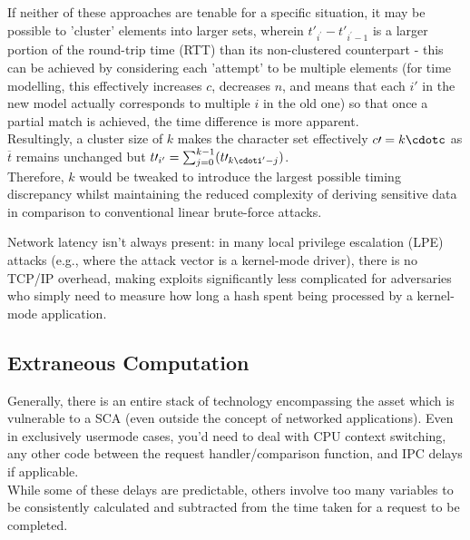 			
				If neither of these approaches are tenable for a specific situation, it may be possible to 'cluster' elements into larger sets, wherein
				\emph{${t\prime}_{i^\prime} - {t\prime}_{i^\prime-1}$} is a larger portion of the round-trip time (RTT) than its non-clustered counterpart -
				this can be achieved by considering each 'attempt' to be
				multiple elements (for time modelling, this effectively increases \emph{$c$}, decreases \emph{$n$}, and means that each \emph{$i\prime$}
				in the new model actually corresponds to multiple \emph{$i$} in the old one) so that once a partial match is achieved, the time difference
				is more apparent.\\
Resultingly, a cluster size of \emph{$k$} makes the character set effectively \emph{$c\prime=k\cdotc$} as
				\emph{$\overline{t}$} remains unchanged but \emph{$t\prime_{i^\prime} = \sum_{j=0}^{k-1}({t\prime}_{k\cdoti^\prime-j})$}.
				\\
Therefore, \emph{$k$} would be tweaked to introduce the largest possible timing discrepancy whilst maintaining the reduced complexity of
				deriving sensitive data in comparison to conventional linear brute-force attacks.
			

			
				Network latency isn't always present: in many local privilege escalation (LPE) attacks (e.g., where the attack vector is a kernel-mode driver),
				there is no TCP/IP overhead, making exploits significantly less complicated for adversaries who simply need to measure how long a hash spent being processed
				by a kernel-mode application.
			

\subsection{Extraneous Computation}
			
				Generally, there is an entire stack of technology encompassing the asset which is vulnerable to a SCA (even outside the concept of networked applications).
				Even in exclusively usermode cases, you'd need to deal with CPU context switching, any other code between the request handler/comparison function, and IPC delays if applicable.
				\\

				While some of these delays are predictable, others involve too many variables to be consistently calculated and subtracted
				from the time taken for a request to be completed.\\

